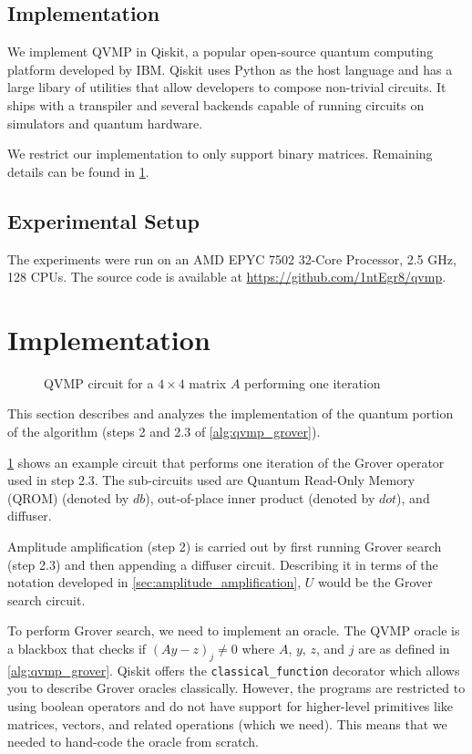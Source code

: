 \documentclass[11pt]{article}
\theoremstyle{definition}
\theoremstyle{remark}
\begin{document}
\subsection{Implementation}

We implement QVMP in Qiskit, a popular open-source quantum computing platform developed by IBM.
Qiskit uses Python as the host language and has a large libary of utilities that allow
developers to compose non-trivial circuits. It ships with a transpiler and
several backends capable of running circuits on simulators and quantum hardware.

We restrict our implementation to only support binary matrices. Remaining
details can be found in \cref{sec:analysis}.

\subsection{Experimental Setup}

The experiments were run on an AMD EPYC 7502 32-Core Processor, 2.5 GHz, 128
CPUs. The source code is available at \url{https://github.com/1ntEgr8/qvmp}.

\section{Implementation} \label{sec:analysis}

\begin{figure}
  \centering
  \scalebox{1.0}{}
  \caption{QVMP circuit for a $4 \times 4$ matrix $A$ performing one iteration}
  \label{fig:qvmp_oracle_4x4}
\end{figure}

This section describes and analyzes the implementation of the quantum portion of
the algorithm (steps 2 and 2.3 of \cref{alg:qvmp_grover}). 

\cref{fig:qvmp_oracle_4x4} shows an example circuit that performs one
iteration of the Grover operator used in step 2.3. The sub-circuits used are
Quantum Read-Only Memory (QROM) \cite{babbush2018encoding} (denoted by $db$), out-of-place
inner product (denoted by $dot$), and diffuser.

Amplitude amplification (step 2) is carried out by first running Grover
search (step 2.3) and then appending a diffuser circuit. Describing it in terms
of the notation developed in \cref{sec:amplitude_amplification}, $U$ would be
the Grover search circuit.

To perform Grover search, we need to implement an oracle. The QVMP oracle is a
blackbox that checks if $(Ay - z)_j \neq 0$ where $A$, $y$, $z$, and $j$ are as
defined in \cref{alg:qvmp_grover}. Qiskit offers the \verb+classical_function+
decorator which allows you to describe Grover oracles classically. However, the
programs are restricted to using boolean operators and do not have support for
higher-level primitives like matrices, vectors, and related operations (which we
need). This means that we needed to hand-code the oracle from scratch.
\end{document}
